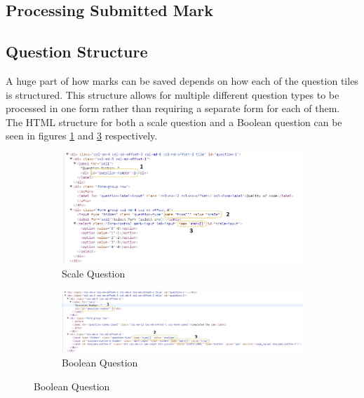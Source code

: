 \documentclass[11pt]{report}
\begin{document}
\subsection{Processing Submitted Mark}

\subsection*{Question Structure}

A huge part of how marks can be saved depends on how each of the question tiles is structured. This structure allows for multiple different question types to be processed in one form rather than requiring a separate form for each of them. The HTML structure for both a scale question and a Boolean question can be seen in figures \ref{fig:struct-scale} and \ref{fig:struct-bool} respectively.  

\begin{figure}[H]
\caption{HTML Structure Of Questions} \label{fig:tile-struct}
\centering
\begin{subfigure}[c]{0.45\textwidth}
    \includegraphics[width=1\textwidth]{images/implementation/question-structure-scale.png}
    \caption{Scale Question}
    \label{fig:struct-scale}
\end{subfigure}
\hfill
\begin{subfigure}[c]{0.45\textwidth}
    \includegraphics[width=1\textwidth]{images/implementation/question-structure-boolean.png}
    \caption{Boolean Question}
    \label{fig:struct-bool}
\end{subfigure}

\end{figure}
\end{document}
